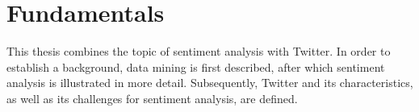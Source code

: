 \chapter{Fundamentals}
\label{cha:Chapter3_Fundamentals}
This thesis combines the topic of sentiment analysis with Twitter. In order to establish a background, data mining is first described, after which sentiment analysis is illustrated in more detail. Subsequently, Twitter and its characteristics, as well as its challenges for sentiment analysis, are defined.


